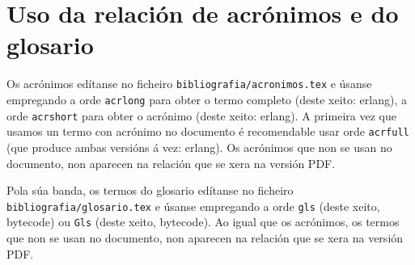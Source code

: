 \section{Uso da relación de acrónimos e do glosario}

Os acrónimos edítanse no ficheiro \texttt{bibliografia/acronimos.tex}
e úsanse empregando a orde \texttt{acrlong} para obter o termo
completo (deste xeito: \acrlong{erlang}), a orde \texttt{acrshort}
para obter o acrónimo (deste xeito: \acrshort{erlang}). A primeira vez
que usamos un termo con acrónimo no documento é recomendable usar orde
\texttt{acrfull} (que produce ambas versións á vez:
\acrfull{erlang}). Os acrónimos que non se usan no documento, non
aparecen na relación que se xera na versión PDF.

Pola súa banda, os termos do glosario edítanse no ficheiro
\texttt{bibliografia/glo\-sa\-rio.tex} e úsanse empregando a orde
\texttt{gls} (deste xeito, \gls{bytecode}) ou \texttt{Gls} (deste
xeito, \Gls{bytecode}). Ao igual que os acrónimos, os termos que non
se usan no documento, non aparecen na relación que se xera na versión
PDF.
